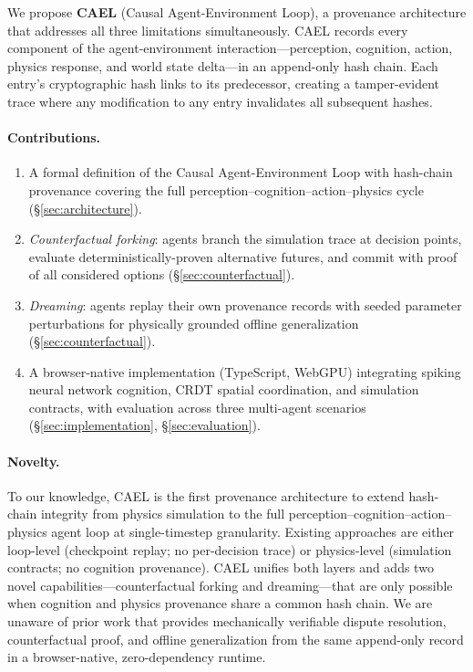 \documentclass[sigconf,nonacm]{acmart}
\begin{document}
We propose \textbf{CAEL} (Causal Agent-Environment Loop), a provenance
architecture that addresses all three limitations simultaneously. CAEL
records every component of the agent-environment interaction---perception,
cognition, action, physics response, and world state delta---in an
append-only hash chain. Each entry's cryptographic hash links to its
predecessor, creating a tamper-evident trace where any modification to
any entry invalidates all subsequent hashes.

\paragraph{Contributions.}
\begin{enumerate}
  \item A formal definition of the Causal Agent-Environment Loop with
        hash-chain provenance covering the full perception--cognition--action--physics cycle (\S\ref{sec:architecture}).
  \item \emph{Counterfactual forking}: agents branch the simulation trace
        at decision points, evaluate deterministically-proven alternative
        futures, and commit with proof of all considered options (\S\ref{sec:counterfactual}).
  \item \emph{Dreaming}: agents replay their own provenance records with
        seeded parameter perturbations for physically grounded offline
        generalization (\S\ref{sec:counterfactual}).
  \item A browser-native implementation (TypeScript, WebGPU) integrating
        spiking neural network cognition, CRDT spatial coordination, and
        simulation contracts, with evaluation across three multi-agent
        scenarios (\S\ref{sec:implementation}, \S\ref{sec:evaluation}).
\end{enumerate}

\paragraph{Novelty.}
To our knowledge, CAEL is the first provenance architecture to extend
hash-chain integrity from physics simulation to the full
perception--cognition--action--physics agent loop at single-timestep
granularity. Existing approaches are either loop-level (checkpoint replay;
no per-decision trace) or physics-level (simulation contracts;
no cognition provenance). CAEL unifies both layers and adds two novel
capabilities---counterfactual forking and dreaming---that are only
possible when cognition and physics provenance share a common hash
chain. We are unaware of prior work that provides mechanically
verifiable dispute resolution, counterfactual proof, and offline
generalization from the same append-only record in a browser-native,
zero-dependency runtime.
\end{document}
